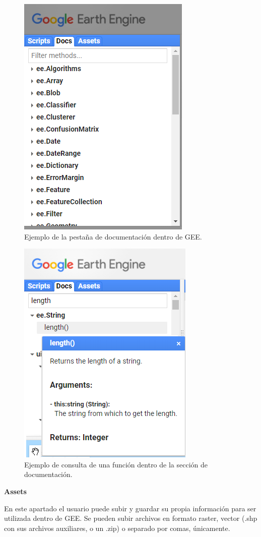 \documentclass[
  12pt,
  letterpaper,
  twoside]{book}
\begin{document}
\begin{figure}

{\centering \includegraphics[width=0.4\linewidth]{Img/docs} 

}

\caption{Ejemplo de la pestaña de documentación dentro de GEE.}\label{fig:unnamed-chunk-10}
\end{figure}

\begin{figure}

{\centering \includegraphics[width=0.4\linewidth]{Img/doc_ejemplo} 

}

\caption{Ejemplo de consulta de una función dentro de la sección de documentación.}\label{fig:unnamed-chunk-11}
\end{figure}

\textbf{Assets}

En este apartado el usuario puede subir y guardar su propia información para ser utilizada dentro de GEE. Se pueden subir archivos en formato raster, vector (.shp con sus archivos auxiliares, o un .zip) o separado por comas, únicamente.
\end{document}
